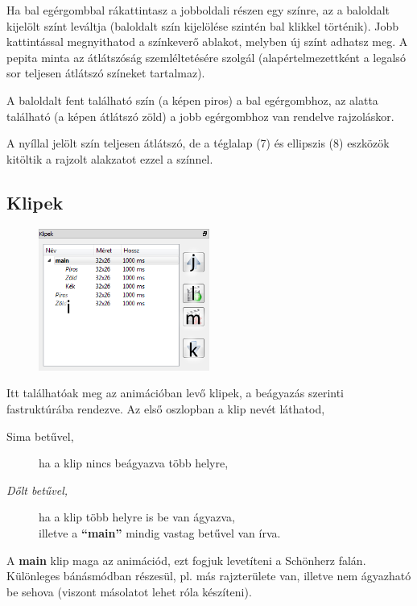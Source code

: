 \documentclass[a4paper,12pt,release]{article}
\begin{document}
Ha bal egérgombbal rákattintasz a jobboldali részen egy színre, az a baloldalt kijelölt színt leváltja (baloldalt szín kijelölése szintén bal klikkel történik). Jobb kattintással megnyithatod a színkeverő ablakot, melyben új színt adhatsz meg. A pepita minta az átlátszóság szemléltetésére szolgál (alapértelmezettként a legalsó sor teljesen átlátszó színeket tartalmaz).

A baloldalt fent található szín (a képen piros) a bal egérgombhoz, az alatta található (a képen átlátszó zöld) a jobb egérgombhoz van rendelve rajzoláskor.

A nyíllal jelölt szín teljesen átlátszó, de a téglalap (7) és ellipszis (8) eszközök kitöltik a rajzolt alakzatot ezzel a színnel.

\subsection{Klipek}
\begin{figure}
	\vspace{-27pt}
	\begin{center}
		\includegraphics[width=0.5\textwidth]{pics/library.png}
	\end{center}
	\vspace{-27pt}
\end{figure}
Itt találhatóak meg az animációban levő klipek, a beágyazás szerinti fastruktúrába rendezve. Az első oszlopban a klip nevét láthatod,
\begin{description}
\item[Sima betűvel,]ha a klip nincs beágyazva több helyre,
\item[\emph{Dőlt betűvel,}]ha a klip több helyre is be van ágyazva,\\
illetve a {\bf ``main''} mindig vastag betűvel van írva.
\end{description}

A {\bf main} klip maga az animációd, ezt fogjuk levetíteni a Schönherz falán. Különleges bánásmódban részesül, pl. más rajzterülete van, illetve nem ágyazható be sehova (viszont másolatot lehet róla készíteni).
\end{document}
